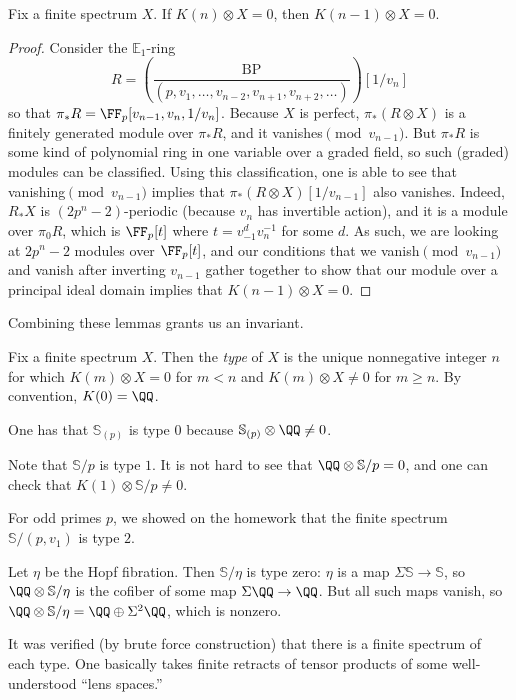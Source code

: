 \documentclass[../notes.tex]{subfiles}
\begin{document}
\begin{lemma}
	Fix a finite spectrum $X$. If $K(n)\otimes X=0$, then $K(n-1)\otimes X=0$.
\end{lemma}
\begin{proof}
	Consider the $\mathbb E_1$-ring
	\[R=\left(\frac{\mathrm{BP}}{(p,v_1,\ldots,v_{n-2},v_{n+1},v_{n+2},\ldots)}\right)[1/v_n]\]
	so that $\pi_*R=\FF_p[v_{n-1},v_n,1/v_n]$. Because $X$ is perfect, $\pi_*(R\otimes X)$ is a finitely generated module over $\pi_*R$, and it vanishes$\pmod{v_{n-1}}$. But $\pi_*R$ is some kind of polynomial ring in one variable over a graded field, so such (graded) modules can be classified. Using this classification, one is able to see that vanishing$\pmod{v_{n-1}}$ implies that $\pi_*(R\otimes X)[1/v_{n-1}]$ also vanishes. Indeed, $R_*X$ is $\left(2p^n-2\right)$-periodic (because $v_n$ has invertible action), and it is a module over $\pi_0R$, which is $\FF_p[t]$ where $t=v_{-1}^dv_n^{-1}$ for some $d$. As such, we are looking at $2p^n-2$ modules over $\FF_p[t]$, and our conditions that we vanish$\pmod{v_{n-1}}$ and vanish after inverting $v_{n-1}$ gather together to show that our module over a principal ideal domain implies that $K(n-1)\otimes X=0$.
\end{proof}
Combining these lemmas grants us an invariant.
\begin{definition}[type]
	Fix a finite spectrum $X$. Then the \textit{type} of $X$ is the unique nonnegative integer $n$ for which $K(m)\otimes X=0$ for $m<n$ and $K(m)\otimes X\ne0$ for $m\ge n$. By convention, $K(0)=\QQ$.
\end{definition}
\begin{example}
	One has that $\mathbb S_{(p)}$ is type $0$ because $\mathbb S_{(p)}\otimes\QQ\ne0$.
\end{example}
\begin{example}
	Note that $\mathbb S/p$ is type $1$. It is not hard to see that $\QQ\otimes\mathbb S/p=0$, and one can check that $K(1)\otimes\mathbb S/p\ne0$.
\end{example}
\begin{example}
	For odd primes $p$, we showed on the homework that the finite spectrum $\mathbb S/(p,v_1)$ is type $2$.
\end{example}
\begin{example} \label{ex:s-eta-type-zero}
	Let $\eta$ be the Hopf fibration. Then $\mathbb S/\eta$ is type zero: $\eta$ is a map $\Sigma\mathbb S\to\mathbb S$, so $\QQ\otimes\mathbb S/\eta$ is the cofiber of some map $\Sigma\QQ\to\QQ$. But all such maps vanish, so $\QQ\otimes\mathbb S/\eta=\QQ\oplus\Sigma^2\QQ$, which is nonzero.
\end{example}
\begin{remark}
	It was verified (by brute force construction) that there is a finite spectrum of each type. One basically takes finite retracts of tensor products of some well-understood ``lens spaces.''
\end{remark}
\end{document}
